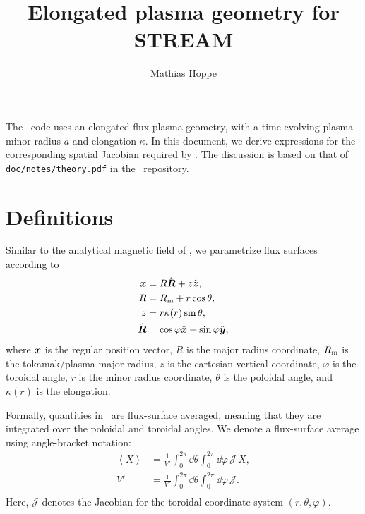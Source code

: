 \documentclass{notes}
\title{Elongated plasma geometry for STREAM}
\author{Mathias Hoppe}
\newcommand{\Rm}{R_{\rm m}}
\newcommand{\Rhat}{\hat{\bb{R}}}
\newcommand{\Jac}{\mathcal{J}}
\begin{document}
    \maketitle

    \noindent
    The \DYON\ code uses an elongated flux plasma geometry, with a time evolving
    plasma minor radius $a$ and elongation $\kappa$. In this document, we derive
    expressions for the corresponding spatial Jacobian required by \STREAM. The
    discussion is based on that of \texttt{doc/notes/theory.pdf} in the \DREAM\
    repository.

    \section{Definitions}
    Similar to the analytical magnetic field of \DREAM, we parametrize flux
    surfaces according to
    \begin{equation}\label{eq:fsparam}
        \begin{aligned}
            \bb{x} &= R\Rhat + z\zhat,\\
            R &= \Rm + r\cos\theta,\\
            z &= r\kappa(r)\sin\theta,\\
            \Rhat &= \cos\varphi\xhat + \sin\varphi\yhat,
        \end{aligned}
    \end{equation}
    where $\boldsymbol{x}$ is the regular position vector, $R$ is the major radius
    coordinate, $\Rm$ is the tokamak/plasma major radius, $z$ is the cartesian
    vertical coordinate, $\varphi$ is the toroidal angle, $r$ is the minor
    radius coordinate, $\theta$ is the poloidal angle, and $\kappa(r)$ is the
    elongation.

    Formally, quantities in \STREAM\ are flux-surface averaged, meaning that
    they are integrated over the poloidal and toroidal angles. We denote a
    flux-surface average using angle-bracket notation:
    \begin{equation}
        \begin{aligned}
            \left\langle X \right\rangle &=
                \frac{1}{V'}\int_0^{2\pi}\dd\theta\int_0^{2\pi}\dd\varphi\,\Jac\,X,\\
            V' &= \frac{1}{V'}\int_0^{2\pi}\dd\theta\int_0^{2\pi}\dd\varphi\,\Jac.\\
        \end{aligned}
    \end{equation}
    Here, $\Jac$ denotes the Jacobian for the toroidal coordinate system
    $(r,\theta,\varphi)$.
\end{document}
